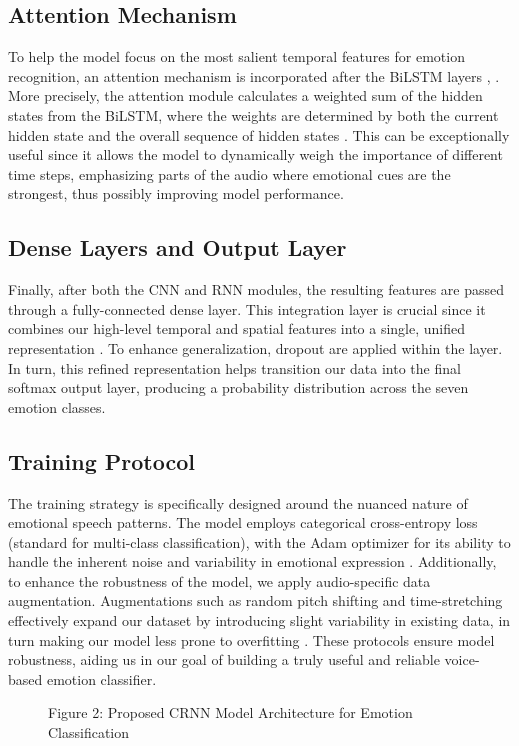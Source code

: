 \documentclass[../main.tex]{subfiles}
\begin{document}
\subsection{Attention Mechanism}
To help the model focus on the most salient temporal features for emotion
recognition, an attention mechanism is incorporated after the BiLSTM layers \citep{Peng2020}, \citep{Chen2018}.
More precisely, the attention module calculates a weighted sum of the hidden
states from the BiLSTM, where the weights are determined by both the current hidden
state and the overall sequence of hidden states \citep{Chen2018}. This can be exceptionally
useful since it allows the model to dynamically weigh the importance of
different time steps, emphasizing parts of the audio where emotional cues are
the strongest, thus possibly improving model performance.

\subsection{Dense Layers and Output Layer}
Finally, after both the CNN and RNN modules, the resulting features are passed
through a fully-connected dense layer. This integration layer is crucial since
it combines our high-level temporal and spatial features into a single, unified
representation \citep{Chen2018}. To enhance generalization, dropout are applied within the layer.
In turn, this refined representation helps transition our data into the final
softmax output layer, producing a probability distribution across the seven
emotion classes.

\subsection{Training Protocol}
The training strategy is specifically designed around the nuanced nature of
emotional speech patterns. The model employs categorical cross-entropy loss
(standard for multi-class classification), with the Adam optimizer for its
ability to handle the inherent noise and variability in emotional expression \citep{Bhatlawande2024}.
Additionally, to enhance the robustness of the model, we apply audio-specific
data augmentation. Augmentations such as random pitch shifting and
time-stretching effectively expand our dataset by introducing slight variability
in existing data, in turn making our model less prone to overfitting \citep{Bhatlawande2024}. These protocols ensure model robustness, aiding us in our goal of building a truly useful and reliable voice-based emotion classifier.

\begin{figure}[h]
    \centering
    
    \caption{Figure 2: Proposed CRNN Model Architecture for Emotion Classification}
    \label{fig:architecture}
\end{figure}
\end{document}
